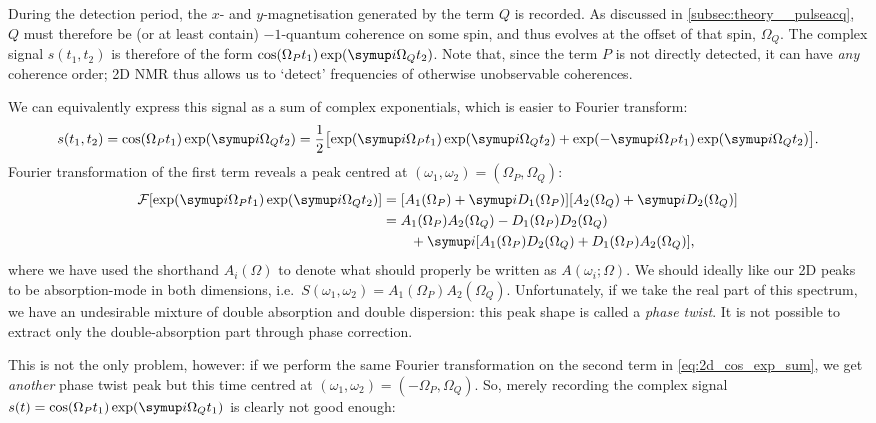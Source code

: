 During the detection period, the $x$- and $y$-magnetisation generated by the term $Q$ is recorded.
As discussed in \cref{subsec:theory__pulseacq}, $Q$ must therefore be (or at least contain) $-1$-quantum coherence on some spin, and thus evolves at the offset of that spin, $\Omega_Q$.
The complex signal $s(t_1, t_2)$ is therefore of the form $\cos(\Omega_P t_1)\exp(\mi \Omega_Q t_2)$.
Note that, since the term $P$ is not directly detected, it can have \textit{any} coherence order; 2D NMR thus allows us to `detect' frequencies of otherwise unobservable coherences.

We can equivalently express this signal as a sum of complex exponentials, which is easier to Fourier transform:
\begin{equation}
    \label{eq:2d_cos_exp_sum}
    s(t_1, t_2) = \cos(\Omega_P t_1)\exp(\mi \Omega_Q t_2) = \frac{1}{2}\bigl[\exp(\mi\Omega_P t_1)\exp(\mi\Omega_Q t_2) + \exp(-\mi\Omega_P t_1)\exp(\mi\Omega_Q t_2)\bigr].
\end{equation}
Fourier transformation of the first term reveals a peak centred at $(\omega_1, \omega_2) = (\Omega_P, \Omega_Q)$:
\begin{align}
    \label{eq:ft_2d_phasetwist}
    \mathcal{F}[\exp(\mi\Omega_P t_1)\exp(\mi\Omega_Q t_2)]
        &= [A_1(\Omega_P) + \mi D_1(\Omega_P)][A_2(\Omega_Q) + \mi D_2(\Omega_Q)] \notag \\
        &= A_1(\Omega_P)A_2(\Omega_Q) - D_1(\Omega_P)D_2(\Omega_Q) \notag \\
        &\quad\quad + \mi[A_1(\Omega_P)D_2(\Omega_Q) + D_1(\Omega_P)A_2(\Omega_Q)],
\end{align}
where we have used the shorthand $A_i(\Omega)$ to denote what should properly be written as $A(\omega_i;\Omega)$.
We should ideally like our 2D peaks to be absorption-mode in both dimensions, i.e.\ $S(\omega_1, \omega_2) = A_1(\Omega_P)A_2(\Omega_Q)$.
Unfortunately, if we take the real part of this spectrum, we have an undesirable mixture of double absorption and double dispersion: this peak shape is called a \textit{phase twist}.
It is not possible to extract only the double-absorption part through phase correction.

This is not the only problem, however: if we perform the same Fourier transformation on the second term in \cref{eq:2d_cos_exp_sum}, we get \textit{another} phase twist peak but this time centred at $(\omega_1, \omega_2) = (-\Omega_P, \Omega_Q)$.
So, merely recording the complex signal $s(t) = \cos(\Omega_P t_1)\exp(\mi\Omega_Q t_1)$ is clearly not good enough:

